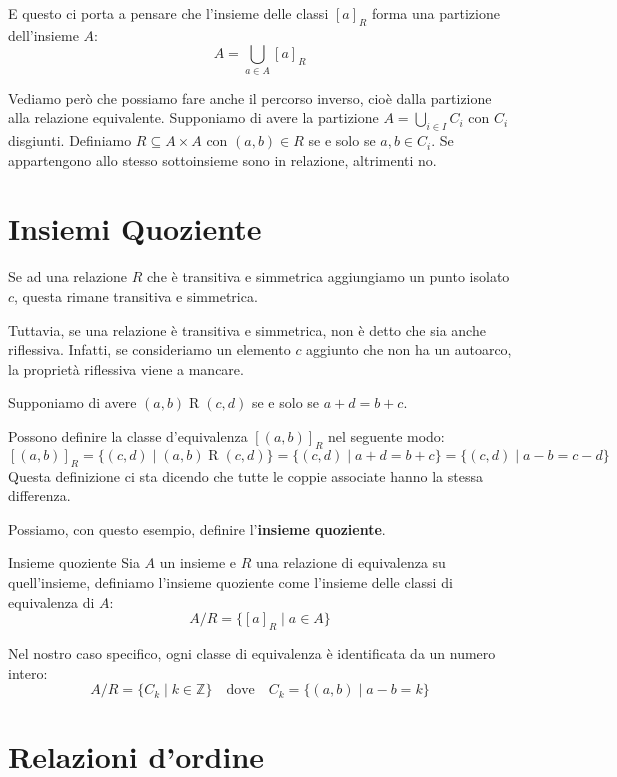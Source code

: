 \documentclass[12pt]{report}
\newcommand{\Z}{\mathbb{Z}}
\begin{document}
	E questo ci porta a pensare che l'insieme delle classi $[a]_R$ forma una partizione dell'insieme $A$:
	\[
	A = \bigcup_{a \in A} [a]_R
	\]
	
	Vediamo però che possiamo fare anche il percorso inverso, cioè dalla partizione alla relazione equivalente.
	Supponiamo di avere la partizione $A = \bigcup_{i \in I} C_i$ con $C_i$ disgiunti.
	Definiamo $R \subseteq A \times A$ con $(a, b) \in R$ se e solo se $a, b \in C_i$.
	Se appartengono allo stesso sottoinsieme sono in relazione, altrimenti no.
	
	\section{Insiemi Quoziente}
	
	\begin{osservazione}{}{}
		Se ad una relazione $R$ che è transitiva e simmetrica aggiungiamo un punto isolato $c$, questa rimane transitiva e simmetrica.
	\end{osservazione}
	
	Tuttavia, se una relazione è transitiva e simmetrica, non è detto che sia anche riflessiva. Infatti, se consideriamo un elemento $c$ aggiunto che non ha un autoarco, la proprietà riflessiva viene a mancare.
	
	Supponiamo di avere $(a,b) \mathrel{R} (c,d)$ se e solo se $a + d = b + c$.
	
	Possono definire la classe d'equivalenza $[(a,b)]_R$ nel seguente modo:
	\[
	[(a,b)]_R = \{(c,d) \mid (a,b) \mathrel{R} (c,d)\} = \{(c,d) \mid a + d = b + c\} = \{(c,d) \mid a - b = c - d\}
	\]
	Questa definizione ci sta dicendo che tutte le coppie associate hanno la stessa differenza.
	
	Possiamo, con questo esempio, definire l'\textbf{insieme quoziente}.
	
	\begin{definizione}{Insieme quoziente}{}
		Sia $A$ un insieme e $R$ una relazione di equivalenza su quell'insieme, definiamo l'insieme quoziente come l'insieme delle classi di equivalenza di $A$:
		\[
		A/R = \{[a]_R \mid a \in A\}
		\]
	\end{definizione}
	
	Nel nostro caso specifico, ogni classe di equivalenza è identificata da un numero intero:
	\[
	A/R = \{C_k \mid k \in \Z\} \quad \text{dove} \quad C_k = \{(a,b) \mid a - b = k\}
	\]
	
	\section{Relazioni d'ordine}
	
\end{document}
